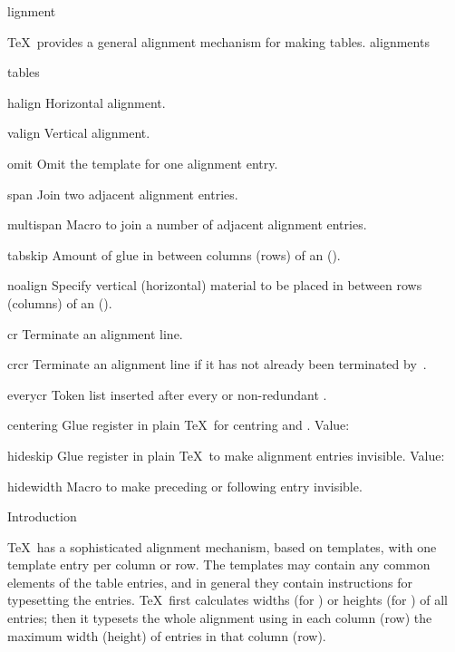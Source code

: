 \subject[align] Alignment

\TeX\ provides a general alignment mechanism for making tables.
\term alignments\par\term tables\par

\invent
\item halign 
      Horizontal alignment.

\item valign 
      Vertical alignment.   

\item omit 
      Omit the template for one alignment entry.

\item span 
      Join two adjacent alignment entries.

\item multispan 
      Macro to join a number of adjacent alignment entries.

\item tabskip 
      Amount of glue in between columns (rows)
      of an  (). 

\item noalign 
      Specify  vertical (horizontal)
      material   to be placed in between rows (columns) of
      an  ().

\item cr
      Terminate an alignment line.

\item crcr 
      Terminate an alignment line if it has 
      not already been terminated by~.

\item everycr 
      Token list inserted after every  or non-redundant 
      .

\item centering 
      Glue register in plain \TeX\ for centring
       and .
      Value: 

\item hideskip
      Glue register in plain \TeX\ to make alignment entries invisible.
      Value: 

\item hidewidth
      Macro to make preceding or following entry invisible.

\inventstop

\point Introduction

\TeX\ has a sophisticated alignment mechanism, based on 
templates, with one template entry per column or row.
The templates may contain any common elements
of the table entries, and in general they contain
instructions for typesetting the entries.
\TeX\ first calculates widths (for ) or heights
(for ) of all entries;
then it typesets the whole alignment using in each column (row)
the maximum width (height) of entries in that column (row).

